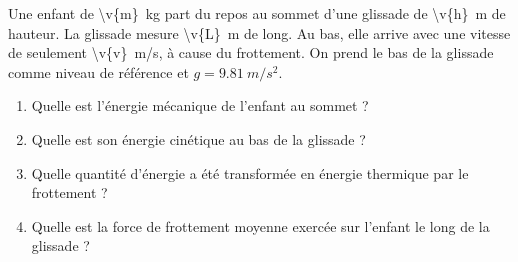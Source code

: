 Une enfant de \qty{\v{m}}{kg} part du repos au sommet d'une glissade de \qty{\v{h}}{m} de hauteur. La glissade mesure \qty{\v{L}}{m} de long. Au bas, elle arrive avec une vitesse de seulement \qty{\v{v}}{m/s}, à cause du frottement. On prend le bas de la glissade comme niveau de référence et $g = \qty{9.81}{m/s^2}$.

\begin{enumerate}[label=\alph*)]
    \item Quelle est l'énergie mécanique de l'enfant au sommet ?
    \item Quelle est son énergie cinétique au bas de la glissade ?
    \item Quelle quantité d'énergie a été transformée en énergie thermique par le frottement ?
    \item Quelle est la force de frottement moyenne exercée sur l'enfant le long de la glissade ?
\end{enumerate}
